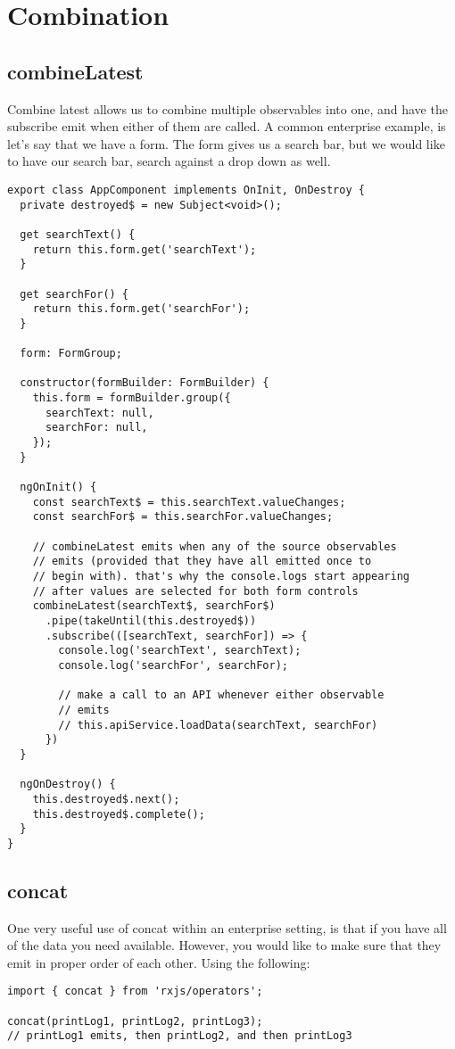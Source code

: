 \chapter{Combination}

\section{combineLatest}
Combine latest allows us to combine multiple observables into one, and have 
the subscribe emit when either of them are called. A common enterprise 
example, is let's say that we have a form. The form gives us a search bar,
but we would like to have our search bar, search against a drop down as well. 

\begin{lstlisting}[caption=search-form.component.ts]
export class AppComponent implements OnInit, OnDestroy {
  private destroyed$ = new Subject<void>();

  get searchText() {
    return this.form.get('searchText');
  }

  get searchFor() {
    return this.form.get('searchFor');
  }

  form: FormGroup;

  constructor(formBuilder: FormBuilder) {
    this.form = formBuilder.group({
      searchText: null,
      searchFor: null,
    });
  }

  ngOnInit() {
    const searchText$ = this.searchText.valueChanges;
    const searchFor$ = this.searchFor.valueChanges;

    // combineLatest emits when any of the source observables
    // emits (provided that they have all emitted once to
    // begin with). that's why the console.logs start appearing
    // after values are selected for both form controls
    combineLatest(searchText$, searchFor$)
      .pipe(takeUntil(this.destroyed$))
      .subscribe(([searchText, searchFor]) => {
        console.log('searchText', searchText);
        console.log('searchFor', searchFor);

        // make a call to an API whenever either observable
        // emits
        // this.apiService.loadData(searchText, searchFor)
      })
  }

  ngOnDestroy() {
    this.destroyed$.next();
    this.destroyed$.complete();
  }
} 
\end{lstlisting}

\section{concat}
One very useful use of concat within an enterprise setting, is that if you 
have all of the data you need available. However, you would like to make 
sure that they emit in proper order of each other. Using the following: 
\begin{lstlisting}[caption=concat-example.ts]
import { concat } from 'rxjs/operators';

concat(printLog1, printLog2, printLog3); 
// printLog1 emits, then printLog2, and then printLog3
\end{lstlisting}

